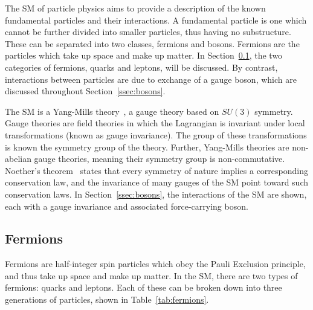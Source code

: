         The \gls{SM} of particle physics aims to provide a description of the known fundamental particles and their interactions. A fundamental particle is one which cannot be further divided into smaller particles, thus having no substructure. These can be separated into two classes, fermions and bosons. Fermions are the particles which take up space and make up matter. In Section~\ref{ssec:fermions}, the two categories of fermions, quarks and leptons, will be discussed. By contrast, interactions between particles are due to exchange of a gauge boson, which are discussed throughout Section~\ref{ssec:bosons}.

        The \gls{SM} is a Yang-Mills theory~\cite{yang-mills}, a gauge theory based on $SU(3)$ symmetry. Gauge theories are field theories in which the Lagrangian is invariant under local transformations (known as gauge invariance). The group of these transformations is known the symmetry group of the theory. Further, Yang-Mills theories are non-abelian gauge theories, meaning their symmetry group is non-commutative. Noether's theorem~\cite{noether} states that every symmetry of nature implies a corresponding conservation law, and the invariance of many gauges of the \gls{SM} point toward such conservation laws. In Section~\ref{ssec:bosons}, the interactions of the \gls{SM} are shown, each with a gauge invariance and associated force-carrying boson.


        \subsection{Fermions}\label{ssec:fermions}
        Fermions are half-integer spin particles which obey the Pauli Exclusion principle, and thus take up space and make up matter. In the \gls{SM}, there are two types of fermions: quarks and leptons. Each of these can be broken down into three generations of particles, shown in Table~\ref{tab:fermions}.

